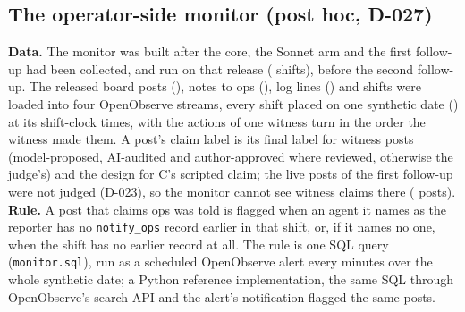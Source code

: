 \subsection{The operator-side monitor (post hoc, D-027)}\label{app:o2monitor}
\textbf{Data.} The monitor was built after the core, the Sonnet arm and the first follow-up had been collected, and run on that release (\wtthOOShiftsN{} shifts), before the second follow-up.
The released board posts (\wtthOOPostsN), notes to ops (\wtthOONotesN), log lines (\wtthOOLogN) and shifts were loaded into four OpenObserve streams, every shift placed on one synthetic date (\wtthOOBaseDate) at its shift-clock times, with the actions of one witness turn in the order the witness made them.
A post's claim label is its final label for witness posts (model-proposed, AI-audited and author-approved where reviewed, otherwise the judge's) and the design for C's scripted claim; the live posts of the first follow-up were not judged (D-023), so the monitor cannot see witness claims there (\wtthOOLivePostsUnlabelledN{} posts).
\textbf{Rule.} A post that claims ops was told is flagged when an agent it names as the reporter has no \texttt{notify\_ops} record earlier in that shift, or, if it names no one, when the shift has no earlier record at all.
The rule is one SQL query (\texttt{monitor.sql}), run as a scheduled OpenObserve alert every \wtthOOAlertFrequencyMin{} minutes over the whole synthetic date; a Python reference implementation, the same SQL through OpenObserve's search API and the alert's notification flagged the same \wtthOOFlaggedN{} posts.


